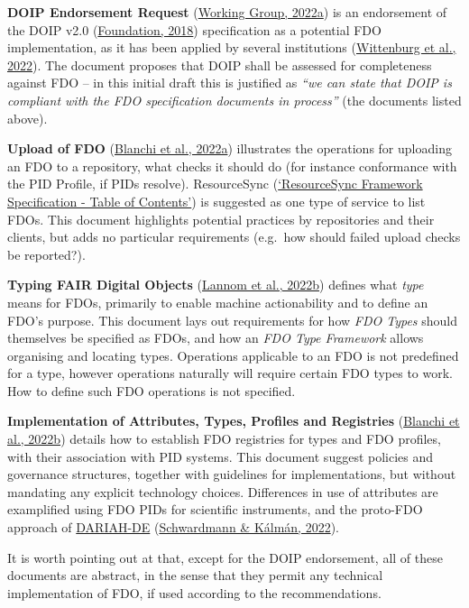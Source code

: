 \textbf{DOIP Endorsement Request} (\protect\hyperlink{ref-15yGpJ0wh}{Working Group, 2022a}) is an endorsement of the DOIP v2.0 (\protect\hyperlink{ref-13TcbsZF6}{Foundation, 2018}) specification as a potential FDO implementation, as it has been applied by several institutions (\protect\hyperlink{ref-jRWurmQc}{Wittenburg et al., 2022}). The document proposes that DOIP shall be assessed for completeness against FDO -- in this initial draft this is justified as \emph{``we can state that DOIP is compliant with the FDO specification documents in process''} (the documents listed above).

\textbf{Upload of FDO} (\protect\hyperlink{ref-1H7cmmr69}{Blanchi et al., 2022a}) illustrates the operations for uploading an FDO to a repository, what checks it should do (for instance conformance with the PID Profile, if PIDs resolve). ResourceSync (\protect\hyperlink{ref-eS5y9TRh}{{`ResourceSync Framework Specification - Table of Contents'}}) is suggested as one type of service to list FDOs. This document highlights potential practices by repositories and their clients, but adds no particular requirements (e.g.~how should failed upload checks be reported?).

\textbf{Typing FAIR Digital Objects} (\protect\hyperlink{ref-ZFzPxCNB}{Lannom et al., 2022b}) defines what \emph{type} means for FDOs, primarily to enable machine actionability and to define an FDO's purpose. This document lays out requirements for how \emph{FDO Types} should themselves be specified as FDOs, and how an \emph{FDO Type Framework} allows organising and locating types. Operations applicable to an FDO is not predefined for a type, however operations naturally will require certain FDO types to work. How to define such FDO operations is not specified.

\textbf{Implementation of Attributes, Types, Profiles and Registries} (\protect\hyperlink{ref-126uxr5pI}{Blanchi et al., 2022b}) details how to establish FDO registries for types and FDO profiles, with their association with PID systems. This document suggest policies and governance structures, together with guidelines for implementations, but without mandating any explicit technology choices. Differences in use of attributes are examplified using FDO PIDs for scientific instruments, and the proto-FDO approach of \href{https://de.dariah.eu/}{DARIAH-DE} (\protect\hyperlink{ref-1CqIZ47pu}{Schwardmann \& Kálmán, 2022}).

It is worth pointing out at that, except for the DOIP endorsement, all of these documents are abstract, in the sense that they permit any technical implementation of FDO, if used according to the recommendations.

